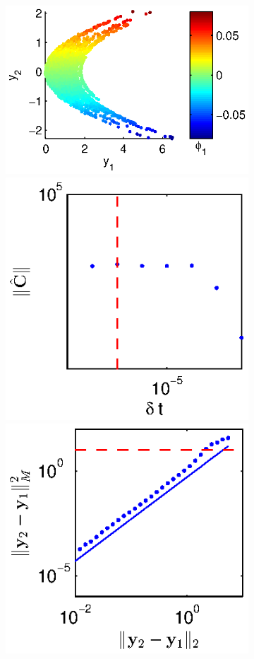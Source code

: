 \begin{figure}[t]
\begin{subfigure}{\textwidth}
\includegraphics[height=\figheight]{data_nonlinear_NIV_dt1_kernel2}
\hfill
\includegraphics[height=\figheight]{C_dt_nonlinear_dt1_kernel2}
\hfill
\includegraphics[height=\figheight]{dist_dy_nonlinear_dt1_kernel2}
\end{subfigure}


\end{figure}
